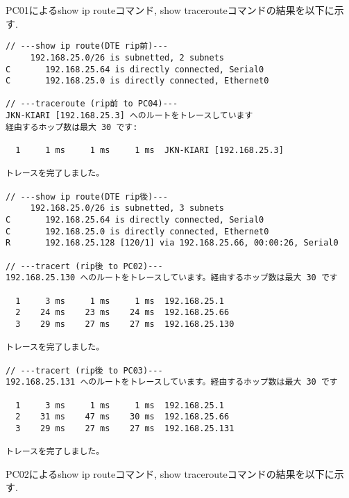 \documentclass{jsarticle}
\begin{document}
PC01によるshow ip routeコマンド, show tracerouteコマンドの結果を以下に示す. 

\begin{lstlisting}[basicstyle=\ttfamily\small, frame=single]
// ---show ip route(DTE rip前)---
     192.168.25.0/26 is subnetted, 2 subnets
C       192.168.25.64 is directly connected, Serial0
C       192.168.25.0 is directly connected, Ethernet0

// ---traceroute (rip前 to PC04)---
JKN-KIARI [192.168.25.3] へのルートをトレースしています
経由するホップ数は最大 30 です:

  1     1 ms     1 ms     1 ms  JKN-KIARI [192.168.25.3]

トレースを完了しました。

// ---show ip route(DTE rip後)---
     192.168.25.0/26 is subnetted, 3 subnets
C       192.168.25.64 is directly connected, Serial0
C       192.168.25.0 is directly connected, Ethernet0
R       192.168.25.128 [120/1] via 192.168.25.66, 00:00:26, Serial0

// ---tracert (rip後 to PC02)---
192.168.25.130 へのルートをトレースしています。経由するホップ数は最大 30 です

  1     3 ms     1 ms     1 ms  192.168.25.1
  2    24 ms    23 ms    24 ms  192.168.25.66
  3    29 ms    27 ms    27 ms  192.168.25.130

トレースを完了しました。

// ---tracert (rip後 to PC03)---
192.168.25.131 へのルートをトレースしています。経由するホップ数は最大 30 です

  1     3 ms     1 ms     1 ms  192.168.25.1
  2    31 ms    47 ms    30 ms  192.168.25.66
  3    29 ms    27 ms    27 ms  192.168.25.131

トレースを完了しました。
\end{lstlisting}

PC02によるshow ip routeコマンド, show tracerouteコマンドの結果を以下に示す. 
\end{document}
